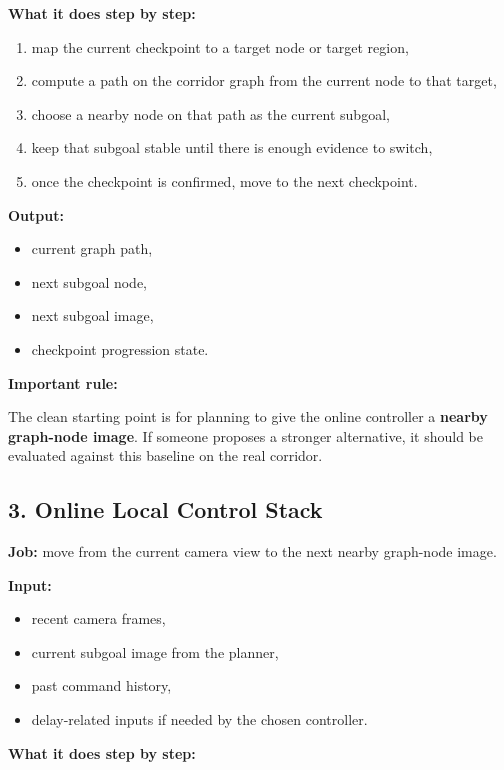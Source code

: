 \documentclass[11pt,a4paper]{article}
\begin{document}
\textbf{What it does step by step:}

\begin{enumerate}[nosep]
  \item map the current checkpoint to a target node or target region,
  \item compute a path on the corridor graph from the current node to that target,
  \item choose a nearby node on that path as the current subgoal,
  \item keep that subgoal stable until there is enough evidence to switch,
  \item once the checkpoint is confirmed, move to the next checkpoint.
\end{enumerate}

\textbf{Output:}

\begin{itemize}[nosep]
  \item current graph path,
  \item next subgoal node,
  \item next subgoal image,
  \item checkpoint progression state.
\end{itemize}

\textbf{Important rule:}

The clean starting point is for planning to give the online controller a \textbf{nearby graph-node image}.
If someone proposes a stronger alternative, it should be evaluated against this baseline on the real corridor.

\subsection{3. Online Local Control Stack}

\textbf{Job:} move from the current camera view to the next nearby graph-node image.

\textbf{Input:}

\begin{itemize}[nosep]
  \item recent camera frames,
  \item current subgoal image from the planner,
  \item past command history,
  \item delay-related inputs if needed by the chosen controller.
\end{itemize}

\textbf{What it does step by step:}
\end{document}

